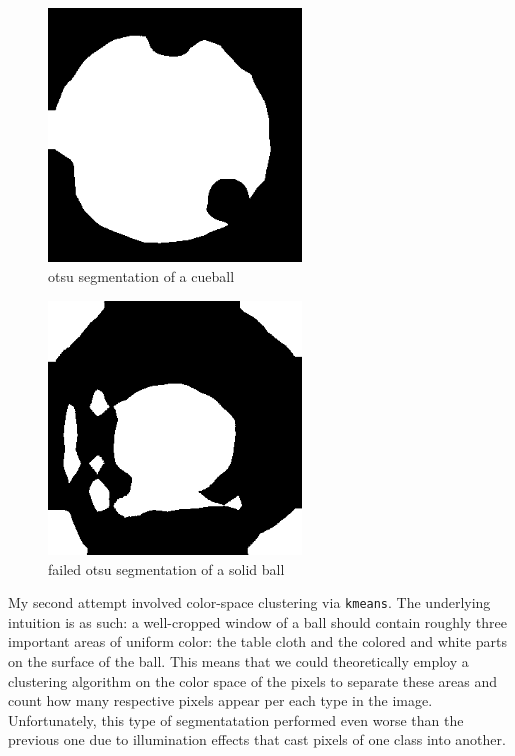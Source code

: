 \begin{figure}
  \includegraphics[width=0.6\textwidth]{./imgs/cueball_otsu.png}
  \caption{otsu segmentation of a cueball}
\end{figure}

\begin{figure}
  \includegraphics[width=0.6\textwidth]{./imgs/bad_otsu.png}
  \caption{failed otsu segmentation of a solid ball}
\end{figure}

My second attempt involved color-space clustering via \verb|kmeans|. 
The underlying intuition is as such: a well-cropped window of a ball should 
contain roughly three important areas of uniform color: the table cloth and 
the colored and white parts on the surface of the ball. This means that 
we could theoretically employ a clustering algorithm on the color space 
of the pixels to separate these areas and count how many respective pixels 
appear per each type in the image.  
Unfortunately, this type of segmentatation performed even worse than the 
previous one due to illumination effects that cast pixels of one class 
into another.

